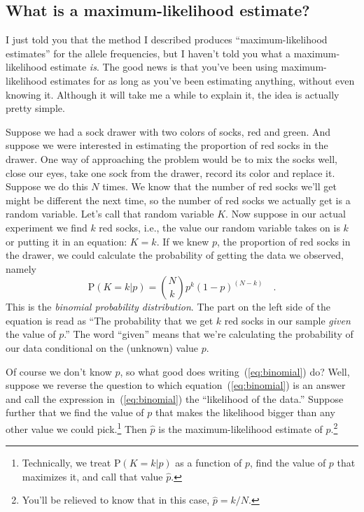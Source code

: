 \subsection*{What is a maximum-likelihood
  estimate?}

I just told you that the method I described produces
``maximum-likelihood estimates'' for the allele frequencies, but I
haven't told you what a maximum-likelihood estimate {\it is\/}. The
good news is that you've been using maximum-likelihood estimates for
as long as you've been estimating anything, without even knowing
it. Although it will take me a while to explain it, the idea is
actually pretty simple.

Suppose we had a sock drawer with two colors of socks, red and
green. And suppose we were interested in estimating the proportion of
red socks in the drawer. One way of approaching the problem would be
to mix the socks well, close our eyes, take one sock from the drawer,
record its color and replace it. Suppose we do this $N$ times. We know
that the number of red socks we'll get might be different the next
time, so the number of red socks we actually get is a random
variable. Let's call that random variable $K$. Now suppose in our
actual experiment we find $k$ red socks, i.e., the value our random
variable takes on is $k$ or putting it in an equation: $K=k$. If we
knew $p$, the proportion of red socks in the drawer, we could
calculate the probability of getting the data we observed, namely
\begin{equation}
\mbox{P}(K=k|p) = {N \choose k} p^k (1-p)^{(N-k)} \quad . \label{eq:binomial}
\end{equation}
This is the {\it binomial probability distribution}. The part on the
left side of the equation is read as ``The probability that we get $k$
red socks in our sample {\it given\/} the value of $p$.'' The word
``given'' means that we're calculating the probability of our data
conditional on the (unknown) value $p$.

Of course we don't know $p$, so what good does
writing~(\ref{eq:binomial}) do? Well, suppose we reverse the question
to which equation~(\ref{eq:binomial}) is an answer and call the
expression in~(\ref{eq:binomial}) the ``likelihood of the data.''
Suppose further that we find the value of $p$ that makes the
likelihood bigger than any other value we could
pick.\footnote{Technically, we treat $\mbox{P}(K=k|p)$ as a function
  of $p$, find the value of $p$ that maximizes it, and call that value
  $\hat p$.} Then $\hat p$ is the maximum-likelihood estimate of
$p$.\footnote{You'll be relieved to know that in this case, $\hat p =
  k/N$.}


